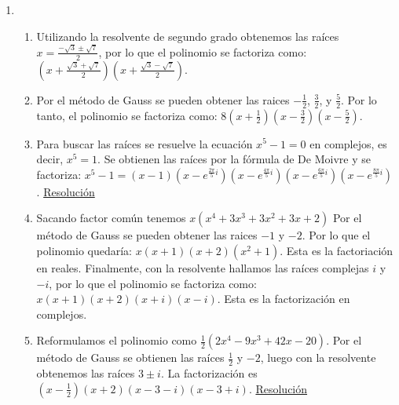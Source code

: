 \documentclass[a4paper]{article}
\newcommand{\exercise}{\item}
\newcommand{\df}[2]{\displaystyle\frac{#1}{#2}}
\begin{document}
\begin{enumerate}
\begin{enumerate} [label=(\alph*)]
		\item El polinomio resultante es $\alpha R(x)^2 - S(x)= \alpha (x-1)^2 - (2x^2-5x)= (\alpha-2) x^2 + (4-2\alpha) x + \alpha$ y necesitamos que tenga grado 1. Para ello el coeficiente cuadrático debe ser nulo, es decir $\alpha=2$. Pero reemplazando ese valor podemos observar que la condición no se cumple ya que $\alpha=2$ también anula el coeficiente lineal y el polinomio resultante queda $0x^2+0x+2$ que tiene grado $0$. Por lo tanto, no existe valor de $\alpha$ que cumpla la condición.
		\item $Q(\gamma)=2 \gamma^2-4\gamma = (4)-1= P(4)$ por lo que obtenemos la ecuación $2 \gamma^2-4\gamma -3 = 0$, de donde despejamos los valores de $\gamma = 1 \pm \sqrt{\df{5}{2}}$.
		\item $\gamma=-7$. \href{https://youtu.be/09D5Z3dcaXc}{Resolución}
		\item $\alpha=6$ y $\beta=6$. \href{https://youtu.be/jE5a43IQ91E}{Resolución}
\end{enumerate}\exercise\begin{enumerate} [label=(\alph*)]		\item Utilizando la resolvente de segundo grado obtenemos las raíces $x=\df{-\sqrt{3}\pm\sqrt{7}}{2}$, por lo que el polinomio se factoriza como: $\left(x+\df{\sqrt{3}+\sqrt{7}}{2}\right)\left(x+\df{\sqrt{3}-\sqrt{7}}{2}\right)$.
		\item Por el método de Gauss se pueden obtener las raices $-\df{1}{2}$, $\df{3}{2}$, y $\df{5}{2}$. Por lo tanto, el polinomio se factoriza como: $8\left(x+\df{1}{2}\right)\left(x-\df{3}{2}\right)\left(x-\df{5}{2}\right)$.
		\item Para buscar las raíces se resuelve la ecuación $x^5-1=0$ en complejos, es decir, $x^5=1$. Se obtienen las raíces por la fórmula de De Moivre y se factoriza: $x^5-1=(x-1)(x-e^{\frac{2\pi}{5}i})(x-e^{\frac{4\pi}{5}i})(x-e^{\frac{6\pi}{5}i})(x-e^{\frac{8\pi}{5}i})$. \href{https://youtu.be/ZMBXAdxOleM}{Resolución}
		\item Sacando factor común tenemos $x(x^4+3x^3+3x^2+3x+2)$ Por el método de Gauss se pueden obtener las raices $-1$ y $-2$. Por lo que el polinomio quedaría: $x(x+1)(x+2)(x^2+1)$. Esta es la factoriación en reales. Finalmente, con la resolvente hallamos las raíces complejas $i$ y $-i$, por lo que el polinomio se factoriza como: $x(x+1)(x+2)(x+i)(x-i)$. Esta es la factorización en complejos.
		\item Reformulamos el polinomio como $\df{1}{2}(2x^4-9x^3+42x-20)$. Por el método de Gauss se obtienen las raíces $\df{1}{2}$ y $-2$, luego con la resolvente obtenemos las raíces $3\pm i$. La factorización es $\left(x-\df{1}{2}\right)(x+2)(x-3-i)(x-3+i)$. \href{https://youtu.be/1V06bnuaadA}{Resolución}

\end{enumerate}
\end{enumerate}
\end{document}
